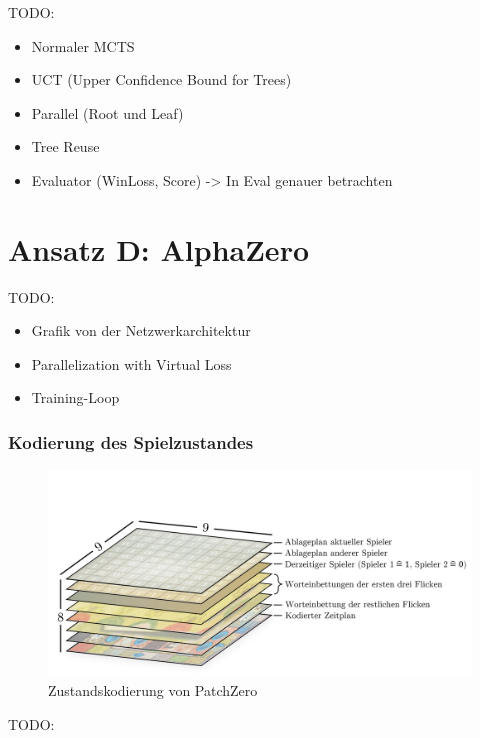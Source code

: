 TODO:

\begin{itemize}
    \item Normaler MCTS
    \item UCT (Upper Confidence Bound for Trees)
    \item Parallel (Root und Leaf)
    \item Tree Reuse
    \item Evaluator (WinLoss, Score) -> In Eval genauer betrachten
\end{itemize}

\section{Ansatz D: AlphaZero}
\label{section:erstellung-ansatz-d}

TODO:

\begin{itemize}
    \item Grafik von der Netzwerkarchitektur
    \item Parallelization with Virtual Loss
    \item Training-Loop
\end{itemize}

\subsubsection*{Kodierung des Spielzustandes}

\begin{figure}[!ht]
    \centering
    \vspace*{-1.75cm}
    \includegraphics[width=\textwidth]{res/pictures/patch-zero-state.png}
    \caption{Zustandskodierung von PatchZero}
    \label{fig:patch-zero-state}
\end{figure}

TODO:

